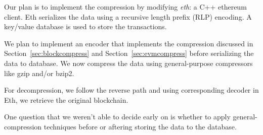 Our plan is to implement the compression by modifying \emph{eth}:
 a C++ ethereum client. 
Eth serializes the data using a recursive length prefix (RLP) encoding.
A key/value database is used to store the transactions.

We plan to implement an encoder  that implements the compression  
discussed in Section~\ref{sec:blockcompress} and Section~\ref{sec:evmcompress} 
before serializing the data to database.
We now compress the data using general-purpose compressors like gzip and/or bzip2.

For decompression, we follow the reverse path and using
corresponding decoder in Eth, we  retrieve the original blockchain.

One question that we weren't able to decide early on is whether to apply general-compression techniques before or aftering storing the data to the database.
